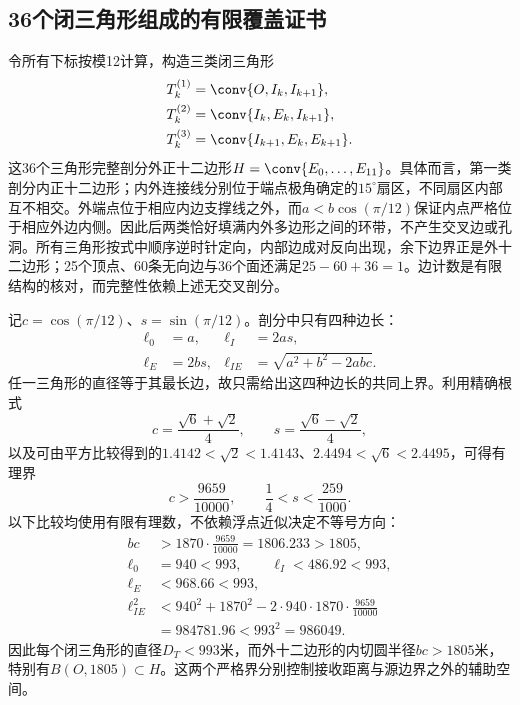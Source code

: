 \subsection{36个闭三角形组成的有限覆盖证书}
令所有下标按模12计算，构造三类闭三角形
\begin{equation}\label{new:eq-triangulation}
\begin{aligned}
T_k^{(1)}&=\conv\{O,I_k,I_{k+1}\},\\
T_k^{(2)}&=\conv\{I_k,E_k,I_{k+1}\},\\
T_k^{(3)}&=\conv\{I_{k+1},E_k,E_{k+1}\}.
\end{aligned}
\end{equation}
这36个三角形完整剖分外正十二边形$H=\conv\{E_0,\ldots,E_{11}\}$。具体而言，第一类剖分内正十二边形；内外连接线分别位于端点极角确定的$15^\circ$扇区，不同扇区内部互不相交。外端点位于相应内边支撑线之外，而$a<b\cos(\pi/12)$保证内点严格位于相应外边内侧。因此后两类恰好填满内外多边形之间的环带，不产生交叉边或孔洞。所有三角形按式中顺序逆时针定向，内部边成对反向出现，余下边界正是外十二边形；25个顶点、60条无向边与36个面还满足$25-60+36=1$。边计数是有限结构的核对，而完整性依赖上述无交叉剖分。

记$c=\cos(\pi/12)$、$s=\sin(\pi/12)$。剖分中只有四种边长：
\begin{equation}\label{new:eq-four-lengths}
\begin{aligned}
\ell_0&=a,& \ell_I&=2as,\\
\ell_E&=2bs,& \ell_{IE}&=\sqrt{a^2+b^2-2ab c}.
\end{aligned}
\end{equation}
任一三角形的直径等于其最长边，故只需给出这四种边长的共同上界。利用精确根式
\[
c=\frac{\sqrt6+\sqrt2}{4},\qquad s=\frac{\sqrt6-\sqrt2}{4},
\]
以及可由平方比较得到的$1.4142<\sqrt2<1.4143$、$2.4494<\sqrt6<2.4495$，可得有理界
\begin{equation}\label{new:eq-trig-bounds}
c>\frac{9659}{10000},\qquad \frac14<s<\frac{259}{1000}.
\end{equation}
以下比较均使用有限有理数，不依赖浮点近似决定不等号方向：
\begin{equation}\label{new:eq-polar-bounds}
\begin{aligned}
bc&>1870\cdot\frac{9659}{10000}=1806.233>1805,\\
\ell_0&=940<993,\qquad \ell_I<486.92<993,\\
\ell_E&<968.66<993,\\
\ell_{IE}^2&<940^2+1870^2-2\cdot940\cdot1870\cdot\frac{9659}{10000}\\
&=984781.96<993^2=986049.
\end{aligned}
\end{equation}
因此每个闭三角形的直径$D_T<993$米，而外十二边形的内切圆半径$bc>1805$米，特别有$B(O,1805)\subset H$。这两个严格界分别控制接收距离与源边界之外的辅助空间。

